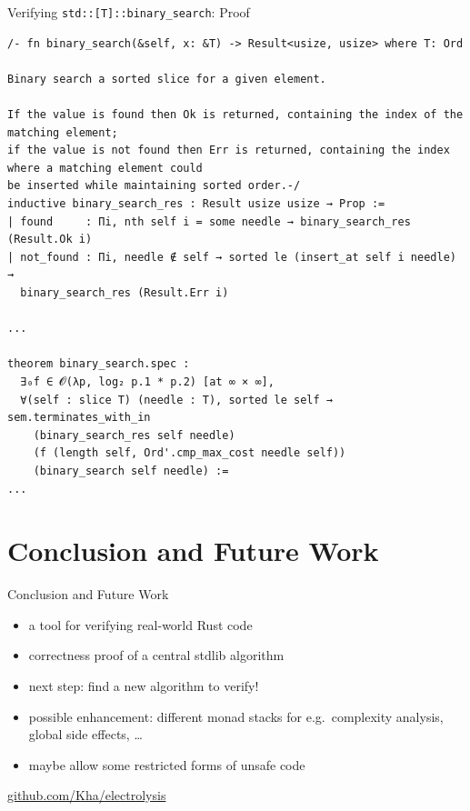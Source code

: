 \documentclass{beamer}
\begin{document}
\begin{frame}[fragile]{Verifying \texttt{std::[T]::binary\_search}: Proof}
  \begin{verbatim}
/- fn binary_search(&self, x: &T) -> Result<usize, usize> where T: Ord

Binary search a sorted slice for a given element.

If the value is found then Ok is returned, containing the index of the matching element;
if the value is not found then Err is returned, containing the index where a matching element could
be inserted while maintaining sorted order.-/
inductive binary_search_res : Result usize usize → Prop :=
| found     : Πi, nth self i = some needle → binary_search_res (Result.Ok i)
| not_found : Πi, needle ∉ self → sorted le (insert_at self i needle) →
  binary_search_res (Result.Err i)

...

theorem binary_search.spec :
  ∃₀f ∈ 𝓞(λp, log₂ p.1 * p.2) [at ∞ × ∞],
  ∀(self : slice T) (needle : T), sorted le self → sem.terminates_with_in
    (binary_search_res self needle)
    (f (length self, Ord'.cmp_max_cost needle self))
    (binary_search self needle) :=
...
  \end{verbatim} 
\end{frame}

\section{Conclusion and Future Work}

\begin{frame}{Conclusion and Future Work}
  \begin{itemize}
    \item a tool for verifying real-world Rust code
    \item correctness proof of a central stdlib algorithm

    \hfill

    \item next step: find a new algorithm to verify!
    \item possible enhancement: different monad stacks for e.g.\ complexity analysis, global side effects, \dots
    \item maybe allow some restricted forms of unsafe code
  \end{itemize}

  \hfill

  \begin{center}
    \large\url{github.com/Kha/electrolysis}
  \end{center}
\end{frame}
\end{document}
